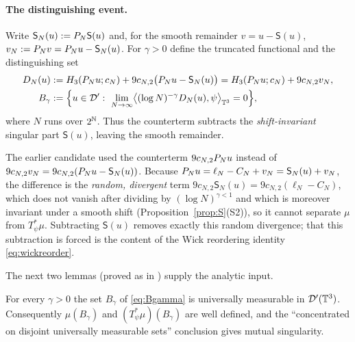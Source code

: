 \paragraph{The distinguishing event.}
Write $\mathsf S_N(u):=P_N\mathsf S(u)$ and, for the smooth remainder
$v=u-\mathsf S(u)$, $v_N:=P_N v=P_N u-\mathsf S_N(u)$. For $\gamma>0$ define
the truncated functional and the distinguishing set
\begin{align}
D_N(u)&:=H_3(P_N u;c_N)+9c_{N,2}\bigl(P_N u-\mathsf S_N(u)\bigr)
=H_3(P_N u;c_N)+9c_{N,2}v_N ,\label{eq:DN}\\
B_\gamma&:=\Bigl\{u\in\mathcal{D}':\ \lim_{N\to\infty}\bigl\langle(\log N)^{-\gamma}D_N(u),\psi\bigr\rangle_{\mathbb{T}^3}=0\Bigr\},\label{eq:Bgamma}
\end{align}
where $N$ runs over $2^{\mathbb{N}}$. Thus the counterterm subtracts the
\emph{shift-invariant} singular part $\mathsf S(u)$, leaving the smooth remainder.

\begin{remark}\label{rem:fix}
The earlier candidate used the counterterm $9c_{N,2}P_N u$ instead of
$9c_{N,2}v_N=9c_{N,2}(P_N u-\mathsf S_N(u))$. Because
$P_N u=\ell_N-C_N+v_N=\mathsf S_N(u)+v_N$, the difference is the \emph{random,
divergent} term $9c_{N,2}\mathsf S_N(u)=9c_{N,2}(\ell_N-C_N)$, which does not
vanish after dividing by $(\log N)^{\gamma<1}$ and which is moreover invariant
under a smooth shift (Proposition~\ref{prop:S}(S2)), so it cannot separate $\mu$
from $T_\psi^*\mu$. Subtracting $\mathsf S(u)$ removes exactly this random
divergence; that this subtraction is forced is the content of the Wick reordering
identity \eqref{eq:wickreorder}.
\end{remark}

The next two lemmas (proved as in \cite[Lems.~3.11--3.12]{HKN24}) supply the analytic input.

\begin{qonelemma}[Measurability]\label{lem:borel}
For every $\gamma>0$ the set $B_\gamma$ of \eqref{eq:Bgamma} is universally
measurable in $\mathcal{D}'(\mathbb{T}^3)$. Consequently $\mu(B_\gamma)$ and
$(T_\psi^*\mu)(B_\gamma)$ are well defined, and the ``concentrated on disjoint
universally measurable sets'' conclusion gives mutual singularity.
\end{qonelemma}

